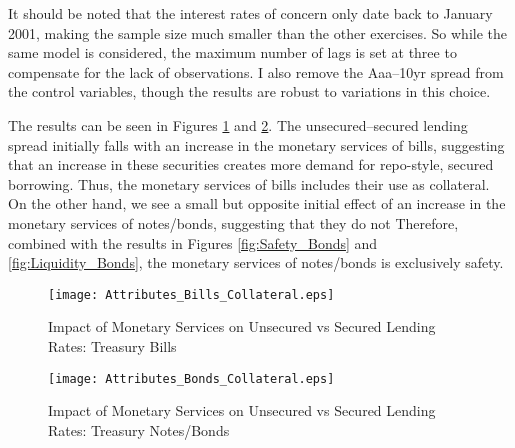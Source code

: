 \documentclass[11pt,a4paper,margin=1.5in]{article}
\begin{document}
It should be noted that the interest rates of concern only date back to January 2001, making the sample size much smaller than the other exercises.
So while the same model is considered, the maximum number of lags is set at three to compensate for the lack of observations.
I also remove the Aaa--10yr spread from the control variables, though the results are robust to variations in this choice. 

The results can be seen in Figures \ref{fig:Collateral_Bills} and \ref{fig:Collateral_Bonds}.
The unsecured--secured lending spread initially falls with an increase in the monetary services of bills, suggesting that an increase in these securities creates more demand for repo-style, secured borrowing.
Thus, the monetary services of bills includes their use as collateral.
On the other hand, we see a small but opposite initial effect of an increase in the monetary services of notes/bonds, suggesting that they do not 
Therefore, combined with the results in Figures \ref{fig:Safety_Bonds} and \ref{fig:Liquidity_Bonds}, the monetary services of notes/bonds is exclusively safety. 
\begin{figure}[p]
\centering
\texttt{[image: Attributes\_Bills\_Collateral.eps]}
\caption{Impact of Monetary Services on Unsecured vs Secured Lending Rates: Treasury Bills}
\label{fig:Collateral_Bills}
\end{figure}

\begin{figure}[p]
\centering
\texttt{[image: Attributes\_Bonds\_Collateral.eps]}
\caption{Impact of Monetary Services on Unsecured vs Secured Lending Rates: Treasury Notes/Bonds}
\label{fig:Collateral_Bonds}
\end{figure}
\end{document}

